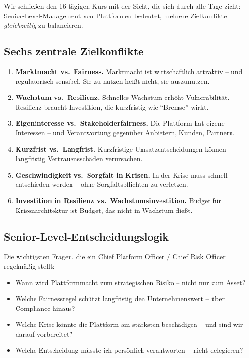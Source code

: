 \documentclass[11pt,a4paper,oneside]{article}
\begin{document}
Wir schließen den 16-tägigen Kurs mit der Sicht, die sich durch alle Tage zieht: Senior-Level-Management von Plattformen bedeutet, mehrere Zielkonflikte \emph{gleichzeitig} zu balancieren.

\subsection{Sechs zentrale Zielkonflikte}

\begin{enumerate}
  \item \textbf{Marktmacht vs.\ Fairness.} Marktmacht ist wirtschaftlich attraktiv -- und regulatorisch sensibel. Sie zu nutzen heißt nicht, sie auszunutzen.
  \item \textbf{Wachstum vs.\ Resilienz.} Schnelles Wachstum erhöht Vulnerabilität. Resilienz braucht Investition, die kurzfristig wie ``Bremse'' wirkt.
  \item \textbf{Eigeninteresse vs.\ Stakeholderfairness.} Die Plattform hat eigene Interessen -- und Verantwortung gegenüber Anbietern, Kunden, Partnern.
  \item \textbf{Kurzfrist vs.\ Langfrist.} Kurzfristige Umsatzentscheidungen können langfristig Vertrauensschäden verursachen.
  \item \textbf{Geschwindigkeit vs.\ Sorgfalt in Krisen.} In der Krise muss schnell entschieden werden -- ohne Sorgfaltspflichten zu verletzen.
  \item \textbf{Investition in Resilienz vs.\ Wachstumsinvestition.} Budget für Krisenarchitektur ist Budget, das nicht in Wachstum fließt.
\end{enumerate}

\subsection{Senior-Level-Entscheidungslogik}

Die wichtigsten Fragen, die ein Chief Platform Officer / Chief Risk Officer regelmäßig stellt:

\begin{itemize}
  \item Wann wird Plattformmacht zum strategischen Risiko -- nicht nur zum Asset?
  \item Welche Fairnessregel schützt langfristig den Unternehmenswert -- über Compliance hinaus?
  \item Welche Krise könnte die Plattform am stärksten beschädigen -- und sind wir darauf vorbereitet?
  \item Welche Entscheidung müsste ich persönlich verantworten -- nicht delegieren?
\end{itemize}
\end{document}
